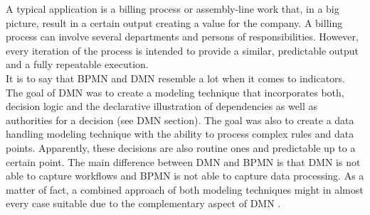 A typical application is a billing process or assembly-line work that, in a big picture, result in a certain output creating a value for the company. A billing process can involve several departments and persons of responsibilities. However, every iteration of the process is intended to provide a similar, predictable output and a fully repeatable execution. \\
It is to say that BPMN and DMN resemble a lot when it comes to indicators. The goal of DMN was to create a modeling technique that incorporates both, decision logic and the declarative illustration of dependencies as well as authorities for a decision (see DMN section). The goal was also to create a data handling modeling technique with the ability to process complex rules and data points. Apparently, these decisions are also routine ones and predictable up to a certain point. The main difference between DMN and BPMN is that DMN is not able to capture workflows and BPMN is not able to capture data processing. As a matter of fact, a combined approach of both modeling techniques might in almost every case suitable due to the complementary aspect of DMN \cite{DMNspec2016}. 

